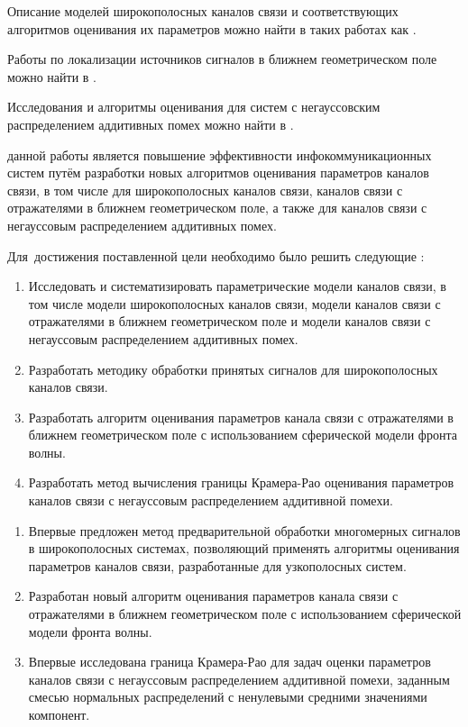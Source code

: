 Описание моделей широкополосных каналов связи и соответствующих алгоритмов оценивания их параметров можно найти в таких работах как \cite{DDW93, HK90, OK90, VB88, WK85, KS90, FW93, CM89, KV96, AeroSK94, AeroCC93}.

Работы по локализации источников сигналов в ближнем геометрическом поле можно найти в \cite{Singh2016, Singh2017a, Singh2017}.

Исследования и алгоритмы оценивания для систем с негауссовским распределением аддитивных помех можно найти в \cite{Kozick2000, Kalyani2012}.

{\aim} данной работы является повышение эффективности инфокоммуникационных систем путём разработки новых алгоритмов оценивания параметров каналов связи, в том числе для широкополосных каналов связи, каналов связи с отражателями в ближнем геометрическом поле, а также для каналов связи с негауссовым распределением аддитивных помех.

Для~достижения поставленной цели необходимо было решить следующие {\tasks}:
\begin{enumerate}
  \item Исследовать и систематизировать параметрические модели каналов связи, в том числе модели широкополосных каналов связи, модели каналов связи с отражателями в ближнем геометрическом поле и модели каналов связи с негауссовым распределением аддитивных помех.
  \item Разработать методику обработки принятых сигналов для широкополосных каналов связи.
  \item Разработать алгоритм оценивания параметров канала связи с отражателями в ближнем геометрическом поле с использованием сферической модели фронта волны.
  \item Разработать метод вычисления границы Крамера-Рао оценивания параметров каналов связи с негауссовым распределением аддитивной помехи.
\end{enumerate}


{\novelty}
\begin{enumerate}
  \item Впервые предложен метод предварительной обработки многомерных сигналов в широкополосных системах, позволяющий применять алгоритмы оценивания параметров каналов связи, разработанные для узкополосных систем.
  \item Разработан новый алгоритм оценивания параметров канала связи с отражателями в ближнем геометрическом поле с использованием сферической модели фронта волны.
  \item Впервые исследована граница Крамера-Рао для задач оценки параметров каналов связи с негауссовым распределением аддитивной помехи, заданным смесью нормальных распределений с ненулевыми средними значениями компонент.
\end{enumerate}

